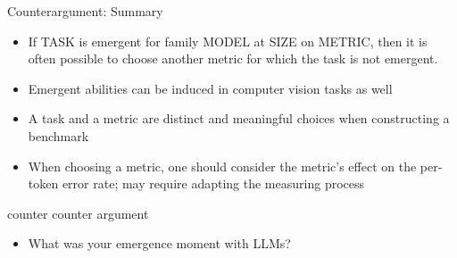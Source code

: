 
\begin{vbframe}{Counterargument: Summary}

\vfill

%
\begin{itemize}
%
\item
If TASK is emergent for family MODEL at SIZE on METRIC, then
it is often possible to choose another metric for which the
task is not emergent.
%
\item Emergent abilities can be induced in computer vision tasks as well
%
\item A task and a metric are distinct and meaningful choices when constructing a benchmark
%
\item When choosing a metric, one should consider the
metric's effect on the per-token error rate;
may require adapting the measuring process
%
\end{itemize}


\vfill

\end{vbframe}



\begin{vbframe}{counter counter argument}

\vfill

%
\begin{itemize}
\item \ques What was your emergence moment with LLMs?

%
\end{itemize}


\vfill

\end{vbframe}








\endlecture

